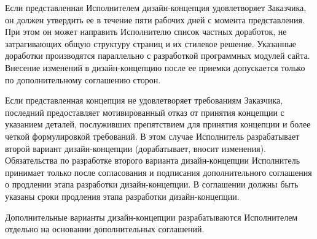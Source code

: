 Если представленная Исполнителем дизайн-концепция удовлетворяет Заказчика, он должен утвердить ее в течение пяти рабочих дней с момента представления. При этом он может направить Исполнителю список частных доработок, не затрагивающих общую структуру страниц и их стилевое решение. Указанные доработки производятся параллельно с разработкой программных модулей сайта. Внесение изменений в дизайн-концепцию после ее приемки допускается только по дополнительному соглашению сторон.

Если представленная концепция не удовлетворяет требованиям Заказчика, последний предоставляет мотивированный отказ от принятия концепции с указанием деталей, послуживших препятствием для принятия концепции и более четкой формулировкой требований. В этом случае Исполнитель разрабатывает второй вариант дизайн-концепции (дорабатывает, вносит изменения). Обязательства по разработке второго варианта дизайн-концепции Исполнитель принимает только после согласования и подписания дополнительного соглашения о продлении этапа разработки дизайн-концепции. В соглашении должны быть указаны сроки продления этапа разработки дизайн-концепции.

Дополнительные варианты дизайн-концепции разрабатываются Исполнителем отдельно на основании дополнительных соглашений.
